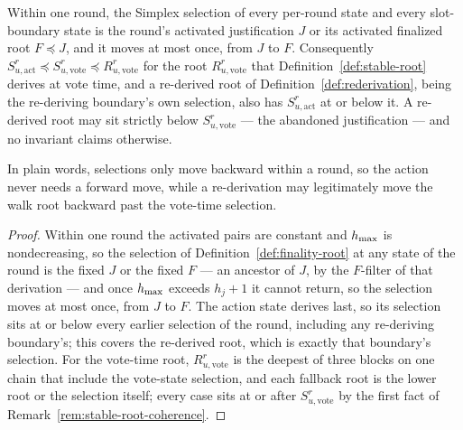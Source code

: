 \begin{lemma}
\label{lem:no-forward-move}
Within one round, the Simplex selection of every per-round state and
every slot-boundary state is the round's activated justification \(J\)
or its activated finalized root \(F\preceq J\), and it moves at most
once, from \(J\) to \(F\).  Consequently
\(S_{u,\mathrm{act}}^r\preceq S_{u,\mathrm{vote}}^r\preceq
R_{u,\mathrm{vote}}^r\) for the root \(R_{u,\mathrm{vote}}^r\) that
Definition~\ref{def:stable-root} derives at vote time, and a
re-derived root of Definition~\ref{def:rederivation}, being the
re-deriving boundary's own selection, also has
\(S_{u,\mathrm{act}}^r\) at or below it.  A re-derived root may sit
strictly below \(S_{u,\mathrm{vote}}^r\) --- the abandoned
justification --- and no invariant claims otherwise.

In plain words, selections only move backward within a round, so the
action never needs a forward move, while a re-derivation may
legitimately move the walk root backward past the vote-time selection.
\end{lemma}

\begin{proof}
Within one round the activated pairs are constant and \(h_{\max}\) is
nondecreasing, so the selection of Definition~\ref{def:finality-root}
at any state of the round is the fixed \(J\) or the fixed \(F\) ---
an ancestor of \(J\), by the \(F\)-filter of that derivation ---
and once \(h_{\max}\) exceeds \(h_j+1\) it cannot return, so the
selection moves at most once, from \(J\) to \(F\).  The action
state derives last, so its selection sits at or below every earlier
selection of the round, including any re-deriving boundary's; this
covers the re-derived root, which is exactly that boundary's selection.
For the vote-time root, \(R_{u,\mathrm{vote}}^r\) is the deepest of
three blocks on one chain that include the vote-state selection, and
each fallback root is the lower root or the selection itself; every
case sits at or after \(S_{u,\mathrm{vote}}^r\) by the first fact of
Remark~\ref{rem:stable-root-coherence}.
\end{proof}

